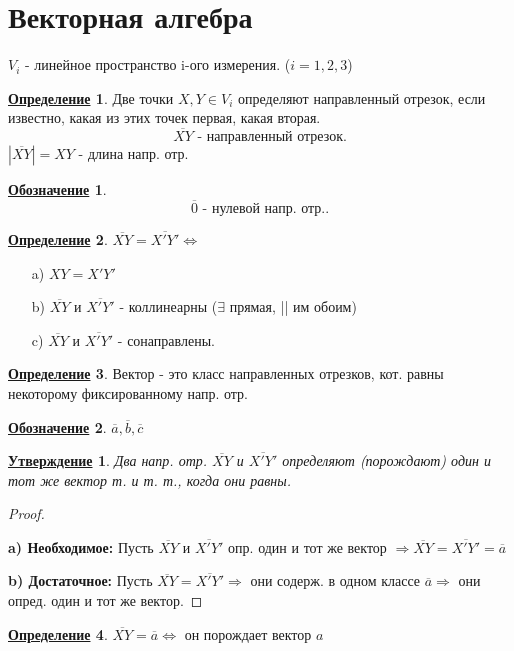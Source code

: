 \documentclass[12pt]{article}
\newtheorem{statement}{\underline{Утверждение}}[section]
\newtheorem*{symb}{\underline{Обозначение}}
\theoremstyle{definition}
\newtheorem{definition}{\underline{Определение}}[section]
\theoremstyle{definition}
\begin{document}
 \section{Векторная алгебра}
 
$V_i$ - линейное пространство  i-ого измерения. ($i = 1, 2, 3$)

\begin{definition}
Две точки $X, Y \in V_i$ определяют направленный отрезок, если известно, какая из этих точек первая, какая вторая.
\[
\overline{XY} \text{ - направленный отрезок}
.\] 
$|\overline{XY}| = XY$ - длина напр. отр.
\end{definition}
\begin{symb}
\[
\overline{0} \text{ - нулевой напр. отр.}
.\] 
\end{symb}

\begin{definition}
$\overline{XY} = \overline{X'Y'} \iff $
\begin{itemize}
    \item [a) ] $XY = X'Y'$
    \item [b) ] $\overline{XY}$ и $\overline{X'Y'}$ - коллинеарны ($\exists $ прямая, || им обоим)
    \item [c) ] $\overline{XY} \text{ и } \overline{X'Y'}$ - сонаправлены.
\end{itemize}
\end{definition}

\begin{definition}
Вектор - это класс направленных отрезков, кот. равны некоторому фиксированному напр. отр.
\end{definition}
\begin{symb}
    $\overline{a}, \overline{b}, \overline{c}$
\end{symb}

\begin{statement}
Два напр. отр. $\overline{XY}$ и $\overline{X'Y'}$ определяют (порождают) один и тот же вектор т. и т. т., когда они равны.
\end{statement}
\begin{proof}
~\newline

\textbf{a) Необходимое: } Пусть $\overline{XY}$ и $\overline{X'Y'}$ опр. один и тот же вектор $ \Rightarrow \overline{XY} = \overline{X'Y'} = \overline{a}$
 
\textbf{b) Достаточное: } Пусть $\overline{XY} = \overline{X'Y'} \Rightarrow $ они содерж. в одном классе $\overline{a} \Rightarrow $  они опред. один и тот же вектор.
\end{proof}
\begin{definition}
$\overline{XY} = \overline{a} \iff $ он порождает вектор $a$
\end{definition}
\end{document}
